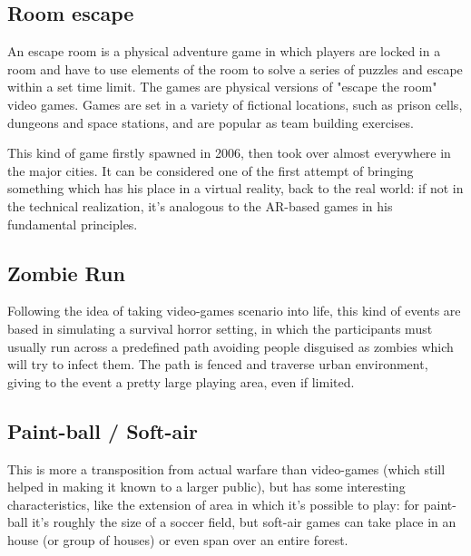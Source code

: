		\subsection{Room escape}
		
			\begin{quoting}
				An escape room is a physical adventure game in which players are locked in a room and have to use elements of the room to solve a series of puzzles and escape within a set time limit. The games are physical versions of "escape the room" video games. Games are set in a variety of fictional locations, such as prison cells, dungeons and space stations, and are popular as team building exercises.~\cite{wiki:escape}
			\end{quoting}
		
			This kind of game firstly spawned in 2006, then took over almost everywhere in the major cities.
			It can be considered one of the first attempt of bringing something which has his place in a virtual reality, back to the real world: if not in the technical realization, it's analogous to the AR-based games in his fundamental principles.
		
		\subsection{Zombie Run}
		
			Following the idea of taking video-games scenario into life, this kind of events are based in simulating a survival horror setting, in which the participants must usually run across a predefined path avoiding people disguised as zombies which will try to infect them. The path is fenced and traverse urban environment, giving to the event a pretty large playing area, even if limited.
		
		\subsection{Paint-ball / Soft-air}
			
			This is more a transposition from actual warfare than video-games (which still helped in making it known to a larger public), but has some interesting characteristics, like the extension of area in which it's possible to play: for paint-ball it's roughly the size of a soccer field, but soft-air games can take place in an house (or group of houses) or even span over an entire forest.